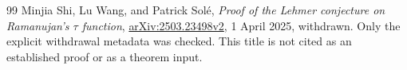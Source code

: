 \begin{thebibliography}{99}
Minjia Shi, Lu Wang, and Patrick Sol\'e,
\emph{Proof of the Lehmer conjecture on Ramanujan's $\tau$ function},
\href{https://arxiv.org/abs/2503.23498}{arXiv:2503.23498v2}, 1 April 2025, withdrawn.
Only the explicit withdrawal metadata was checked. This title is not cited as an established proof or as a theorem input.

\end{thebibliography}
